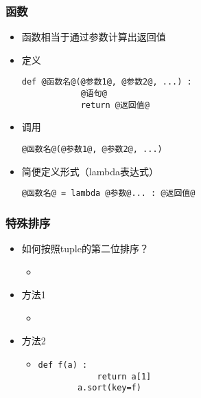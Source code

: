\begin{CJK}{UTF8}{gbsn}
\begin{frame} [fragile]
	\frametitle{函数}
	\begin{itemize}
	\item 函数相当于通过参数计算出返回值
	\item 定义
		\begin{lstlisting}[style=pythonstyle, gobble=8, texcl, escapechar=@]
		def @函数名@(@参数1@, @参数2@, ...) :
			@语句@
			return @返回值@
		\end{lstlisting}
	\item 调用
		\begin{lstlisting}[style=pythonstyle, gobble=8, texcl, escapechar=@]
		@函数名@(@参数1@, @参数2@, ...)
		\end{lstlisting}
	\item 简便定义形式（lambda表达式）
		\begin{lstlisting}[style=pythonstyle, gobble=8, texcl, escapechar=@]
		@函数名@ = lambda @参数@... : @返回值@
		\end{lstlisting}
	\end{itemize}
\end{frame}

\begin{frame} [fragile]
	\frametitle{特殊排序}
	\linespread{1.25}
	\begin{itemize}
	\item 如何按照tuple的第二位排序？
		\begin{itemize}
		\item {}
		\end{itemize}
	\item 方法1
		\begin{itemize}
		\item {}
		\end{itemize}
	\item 方法2
		\begin{itemize}
		\item 
		\begin{lstlisting}[style=pythonstyle, gobble=8, texcl, escapechar=@]
		def f(a) : 
			return a[1]
		a.sort(key=f)
		\end{lstlisting}
		\end{itemize}
	\end{itemize}
\end{frame}


\end{CJK}
